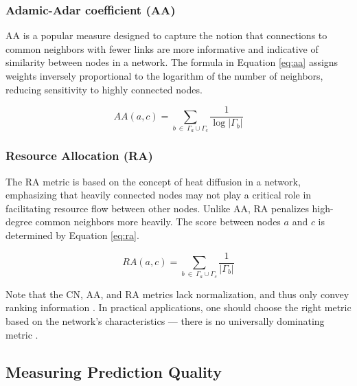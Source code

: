 \subsubsection{Adamic-Adar coefficient (AA)}

AA \cite{adamic2003friends} is a popular measure designed to capture the notion that connections to common neighbors with fewer links are more informative and indicative of similarity between nodes in a network. The formula in Equation \ref{eq:aa} assigns weights inversely proportional to the logarithm of the number of neighbors, reducing sensitivity to highly connected nodes.

\begin{equation}
\label{eq:aa}
  AA(a, c) = \sum_{b\ \in\ \Gamma_a \cup \Gamma_c} \frac{1}{\log{|\Gamma_b|}}
\end{equation}


\subsubsection{Resource Allocation (RA)}

The RA metric \cite{zhou2010solving} is based on the concept of heat diffusion in a network, emphasizing that heavily connected nodes may not play a critical role in facilitating resource flow between other nodes. Unlike AA, RA penalizes high-degree common neighbors more heavily. The score between nodes $a$ and $c$ is determined by Equation \ref{eq:ra}.

\begin{equation}
\label{eq:ra}
  RA(a, c) = \sum_{b\ \in\ \Gamma_a \cup \Gamma_c} \frac{1}{|\Gamma_b|}
\end{equation}

Note that the CN, AA, and RA metrics lack normalization, and thus only convey ranking information \cite{wang2014link}. In practical applications, one should choose the right metric based on the network's characteristics --- there is no universally dominating metric \cite{zhou2021progresses, ghasemian2020stacking, wang2014link, liben2003link}.




\subsection{Measuring Prediction Quality}

